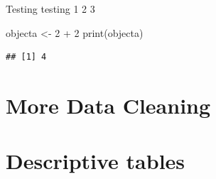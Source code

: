 \documentclass[
]{book}
\newenvironment{Shaded}{\begin{snugshade}}{\end{snugshade}}
\newcommand{\DecValTok}[1]{\textcolor[rgb]{0.00,0.00,0.81}{#1}}
\newcommand{\FunctionTok}[1]{\textcolor[rgb]{0.00,0.00,0.00}{#1}}
\newcommand{\NormalTok}[1]{#1}
\newcommand{\OtherTok}[1]{\textcolor[rgb]{0.56,0.35,0.01}{#1}}
\newcommand{\SpecialCharTok}[1]{\textcolor[rgb]{0.00,0.00,0.00}{#1}}
\begin{document}
Testing testing 1 2 3

\begin{Shaded}
\begin{Highlighting}[]
\NormalTok{objecta }\OtherTok{\textless{}{-}} \DecValTok{2} \SpecialCharTok{+} \DecValTok{2}
\FunctionTok{print}\NormalTok{(objecta)}
\end{Highlighting}
\end{Shaded}

\begin{verbatim}
## [1] 4
\end{verbatim}

\hypertarget{more-data-cleaning}{%
\chapter{More Data Cleaning}\label{more-data-cleaning}}

\hypertarget{descriptive-tables}{%
\chapter{Descriptive tables}\label{descriptive-tables}}

  
\end{document}
